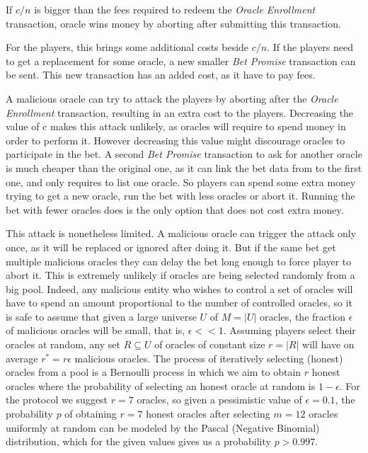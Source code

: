 If $c/n$ is bigger than the fees required to redeem the
  \textit{Oracle Enrollment} transaction, oracle wins money by aborting after
  submitting this transaction.

For the players, this brings some additional costs beside $c/n$.
If the players need to get a replacement for some oracle, a new smaller
  \textit{Bet Promise} transaction can be sent.
This new transaction has an added cost, as it have to pay fees.

A malicious oracle can try to attack the players by aborting after the
  \textit{Oracle Enrollment} transaction, resulting in an extra cost to the
  players.
Decreasing the value of c makes this attack unlikely, as oracles will require
  to spend money in order to perform it.
However decreasing this value might discourage oracles to participate in the
  bet.
A second \textit{Bet Promise} transaction to ask for another oracle is much
  cheaper than the original one, as it can link the bet data from to the first
  one, and only requires to list one oracle.
So players can spend some extra money trying to get a new oracle, run the bet
  with less oracles or abort it.
Running the bet with fewer oracles does is the only option that does not cost
  extra money.

This attack is nonetheless limited.
A malicious oracle can trigger the attack only once, as it will be replaced or
  ignored after doing it.
But if the same bet get multiple malicious oracles they can delay the bet long
  enough to force player to abort it.
This is extremely unlikely if oracles are being selected randomly from a big
  pool.
Indeed, any malicious entity who wishes to control a set of oracles will have to spend an amount
  proportional to the number of controlled oracles, so it is safe to assume that
  given a large universe $U$ of $M = |U|$ oracles, the fraction $\epsilon$ of malicious oracles will be
  small, that is, $\epsilon << 1$.
Assuming players select their oracles at random,
  any set $R\subseteq U$ of oracles of constant size $r=|R|$ will have on average $r^*=r\epsilon$ malicious
  oracles.
The process of iteratively selecting (honest) oracles from a pool is a
  Bernoulli process in which we aim to obtain $r$ honest oracles where the probability of
  selecting an honest oracle at random is $1-\epsilon$.
For the protocol we suggest $r=7$ oracles, so given a pessimistic value of $\epsilon = 0.1$,
  the probability $p$ of obtaining $r=7$ honest oracles after selecting $m=12$ oracles uniformly
  at random can be modeled by the Pascal (Negative Binomial) distribution, which for the given values
  gives us a probability $p>0.997$.


